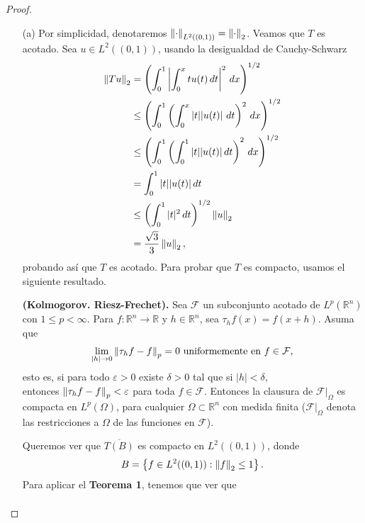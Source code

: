 \begin{proof}
    \begin{enumerate}
        \item[(a)] Por simplicidad, denotaremos $\left\|\cdot\right\|_{L^2((0,1))}=\left\|\cdot\right\|_2$. Veamos que $T$ es acotado. Sea $u \in L^2((0,1))$, usando la desigualdad de Cauchy-Schwarz
        \begin{align*}
            \norm{Tu}_2&=\left(\int_0^1\left|\int_0^x tu(t)\, dt\right|^2\, dx\right)^{1/2}\\
            &\leq \left(\int_0^1 \left(\int_0^x |t||u(t)|\ dt\right)^2\, dx\right)^{1/2}\\
            &\leq \left(\int_0^1 \left(\int_0^1|t||u(t)|\, dt\right)^2\, dx\right)^{1/2}\\
            &=\int_0^1 |t||u(t)|\, dt\\
            &\leq \left(\int_0^1 |t|^2\, dt\right)^{1/2}\norm{u}_2\\
            &=\dfrac{\sqrt{3}}{3}\norm{u}_2,
        \end{align*}
        probando así que $T$ es acotado. Para probar que $T$ es compacto, usamos el siguiente resultado.
        \begin{theorem}
            \textbf{(Kolmogorov. Riesz-Frechet).} Sea $\mathcal{F}$ un subconjunto acotado de $L^p(\mathbb{R}^n)$ con $1\leq p<\infty$. Para $f:\mathbb{R}^n\to \mathbb{R}$ y $h \in \mathbb{R}^n$, sea $\tau_h f(x)=f(x+h)$. Asuma que
            \begin{align*}
                \lim_{|h|\to 0}\left\|\tau_h f-f\right\|_p=0 \text{ uniformemente en } f \in\mathcal{F},
            \end{align*}
            esto es, si para todo $\varepsilon>0$ existe $\delta>0$ tal que si $|h|<\delta$,\\ entonces $\left\|\tau_h f-f\right\|_p<\varepsilon$ para toda $f \in \mathcal{F}$. Entonces la clausura de $\mathcal{F}\big|_{\Omega}$ es compacta en $L^p(\Omega)$, para cualquier $\Omega\subset \mathbb{R}^n$ con medida finita ($\mathcal{F}\big|_\Omega$ denota las restricciones a $\Omega$ de las funciones en $\mathcal{F}$).
        \end{theorem}
        Queremos ver que $\overline{T(B)}$ es compacto en $L^2((0,1))$, donde
        \begin{align*}
            B=\left\{f \in L^{2}((0,1)): \left\|f\right\|_2\leq 1\right\}. 
        \end{align*}
        Para aplicar el \textbf{Teorema 1}, tenemos que ver que 
        \begin{align*}

\end{align*}
\end{enumerate}
\end{proof}
